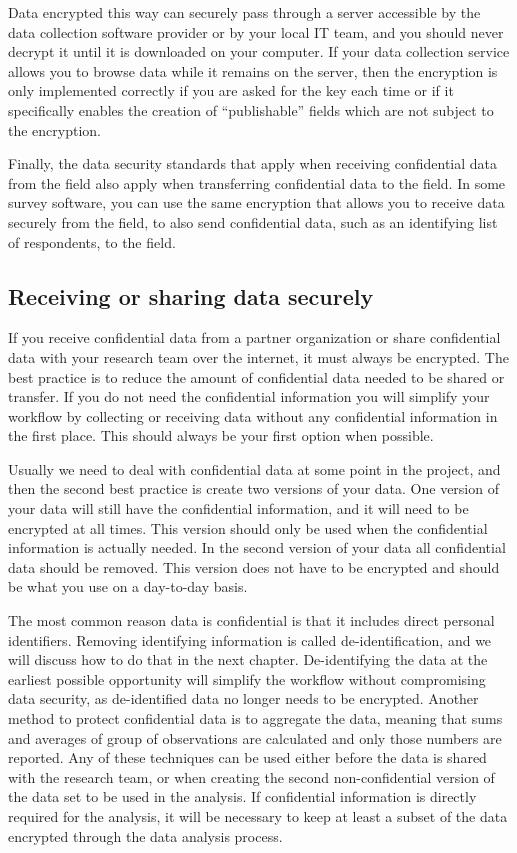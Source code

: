 Data encrypted this way can securely pass
through a server accessible by the data collection software provider
or by your local IT team,
and you should never decrypt it until it is downloaded on your computer.
If your data collection service allows you
to browse data while it remains on the server,
then the encryption is only implemented correctly
if you are asked for the key each time
or if it specifically enables the creation of ``publishable''
fields which are not subject to the encryption.

Finally, the data security standards that apply
when receiving confidential data from the field
also apply when transferring confidential data to the field.
In some survey software,
you can use the same encryption that allows you to receive data securely
from the field, to also send confidential data,
such as an identifying list of respondents, to the field.

\subsection{Receiving or sharing data securely}

If you receive confidential data from a partner organization
or share confidential data with your research team over the internet,
it must always be encrypted.
The best practice is to reduce the amount of confidential data
needed to be shared or transfer.
If you do not need the confidential information you will simplify your workflow
by collecting or receiving data without any confidential information in the first place.
This should always be your first option when possible.

Usually we need to deal with confidential data at some point in the project,
and then the second best practice is create two versions of your data.
One version of your data will still have the confidential information,
and it will need to be encrypted at all times.
This version should only be used
when the confidential information is actually needed.
In the second version of your data all confidential data should be removed.
This version does not have to be encrypted
and should be what you use on a day-to-day basis.

The most common reason data is confidential
is that it includes direct personal identifiers.
Removing identifying information is called de-identification,
and we will discuss how to do that in the next chapter.
De-identifying the data at the earliest possible opportunity
will simplify the workflow without compromising data security,
as de-identified data no longer needs to be encrypted.
Another method to protect confidential data is to aggregate the data,
meaning that sums and averages of group of observations are calculated
and only those numbers are reported.
Any of these techniques can be used either
before the data is shared with the research team,
or when creating the second non-confidential version
of the data set to be used in the analysis.
If confidential information is directly required for the analysis,
it will be necessary to keep at least a subset of the data
encrypted through the data analysis process.

